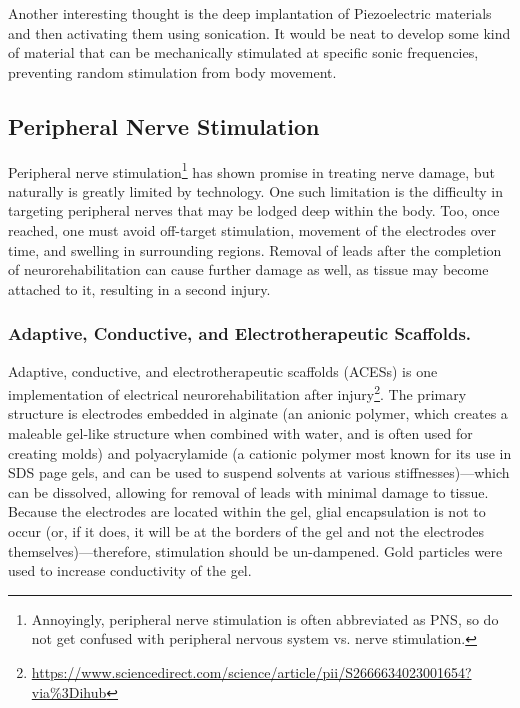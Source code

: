\documentclass[12pt]{report}
\begin{document}
Another interesting thought is the deep implantation of Piezoelectric materials and then activating them using sonication. It would be neat to develop some kind of material that can be mechanically stimulated at specific sonic frequencies, preventing random stimulation from body movement. 


\subsection{Peripheral Nerve Stimulation} 
Peripheral nerve stimulation\footnote{Annoyingly, peripheral nerve stimulation is often abbreviated as PNS, so do not get confused with peripheral nervous system vs. nerve stimulation.} has shown promise in treating nerve damage, but naturally is greatly limited by technology. One such limitation is the difficulty in targeting peripheral nerves that may be lodged deep within the body. Too, once reached, one must avoid off-target stimulation, movement of the electrodes over time, and swelling in surrounding regions. Removal of leads after the completion of neurorehabilitation can cause further damage as well, as tissue may become attached to it, resulting in a second injury. 


\subsubsection{Adaptive, Conductive, and
Electrotherapeutic Scaffolds.}
Adaptive, conductive, and electrotherapeutic scaffolds (ACESs) is one implementation of electrical neurorehabilitation after injury\footnote{\url{https://www.sciencedirect.com/science/article/pii/S2666634023001654?via\%3Dihub}}. The primary structure is electrodes embedded in alginate (an anionic polymer, which creates a maleable gel-like structure when combined with water, and is often used for creating molds) and polyacrylamide (a cationic polymer most known for its use in SDS page gels, and can be used to suspend solvents at various stiffnesses)---which can be dissolved, allowing for removal of leads with minimal damage to tissue. Because the electrodes are located within the gel, glial encapsulation is not to occur (or, if it does, it will be at the borders of the gel and not the electrodes themselves)---therefore, stimulation should be un-dampened. Gold particles were used to increase conductivity of the gel.\newline
\end{document}
